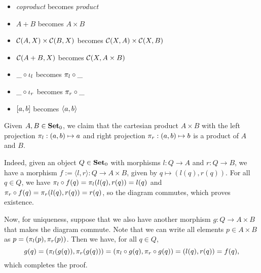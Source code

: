 \begin{solution}
\begin{itemize}
	\item \textit{coproduct} becomes \textit{product}
	\item $A+B$ becomes $A\times B$
	\item $\mathcal{C}(A,X)\times\mathcal{C}(B,X)$ becomes $\mathcal{C}(X,A)\times\mathcal{C}(X,B)$
	\item $\mathcal{C}(A+B,X)$ becomes $\mathcal{C}(X,A\times B)$
	\item $\_ \circ \iota_l$ becomes $\pi_l \circ \_$
	\item $\_ \circ \iota_r$ becomes $\pi_r \circ \_$
	\item $[ a, b ]$ becomes $\langle a, b \rangle$
\end{itemize}
\end{solution}

\begin{solution}\label{sol:product_set}
Given $ A, B \in {\mathbf{Set}}_0 $, we claim that the cartesian product $ A \times B $ with the left projection $ \pi_l: (a, b) \mapsto a $ and right projection $ \pi_r: (a, b) \mapsto b $ is a product of $ A $ and $ B $.

Indeed, given an object $ Q \in {\mathbf{Set}}_0 $ with morphisms $ l: Q \to A $ and $ r: Q \to B $, we have a morphism $ f := \langle l, r \rangle : Q \to A \times B $, given by $ q \mapsto (l(q), r(q)) $. For all $ q \in Q $, we have $ \pi_l \circ f(q) = \pi_l(l(q), r(q)) = l(q) $ and $ \pi_r \circ f(q) = \pi_r(l(q), r(q)) = r(q) $, so the diagram commutes, which proves existence.

Now, for uniqueness, suppose that we also have another morphism $ g: Q \to A \times B $ that makes the diagram commute. Note that we can write all elements $ p \in A \times B $ as $ p = (\pi_l(p), \pi_r(p)) $. Then we have, for all $ q \in Q $,
\[ g(q) = (\pi_l(g(q)), \pi_r(g(q))) = (\pi_l \circ g(q), \pi_r \circ g(q)) = (l(q), r(q)) = f(q), \]
which completes the proof.
\end{solution}


